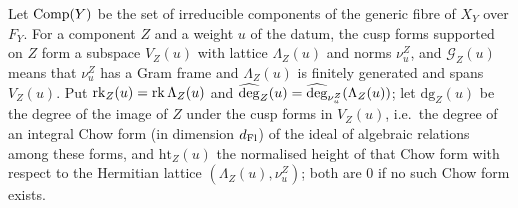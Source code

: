 \begin{definition}
Let $\operatorname{Comp}(Y)$ be the set of irreducible components of the generic fibre of $X_Y$ over $F_Y$. For a component
$Z$ and a weight $u$ of the datum, the cusp forms supported on $Z$ form a subspace $V_Z(u)$ with lattice
$\Lambda_Z(u)$ and norms $\nu^Z_u$, and $\mathcal G_Z(u)$ means that $\nu^Z_u$ has a Gram frame and $\Lambda_Z(u)$ is
finitely generated and spans $V_Z(u)$. Put $\mathrm{rk}_Z(u)=\operatorname{rk}\Lambda_Z(u)$ and
$\widehat{\operatorname{deg}}_Z(u)=\widehat{\operatorname{deg}}_{\nu^Z_u}(\Lambda_Z(u))$; let $\mathrm{dg}_Z(u)$ be the degree of the image of $Z$
under the cusp forms in $V_Z(u)$, i.e.\ the degree of an integral Chow form (in dimension $d_{\mathrm{Fl}}$) of the ideal
of algebraic relations among these forms, and $\mathrm{ht}_Z(u)$ the normalised height of that Chow form with respect
to the Hermitian lattice $(\Lambda_Z(u),\nu^Z_u)$; both are $0$ if no such Chow form exists.
\end{definition}

